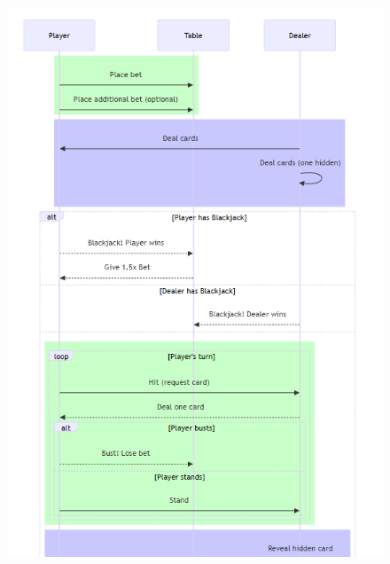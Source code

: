 \begin{figure}[!htb]
    \centering
    \includegraphics[scale=0.55]{report/img/sequenceDiagram.png}
    \label{fig:seqDiagram}
\end{figure}
